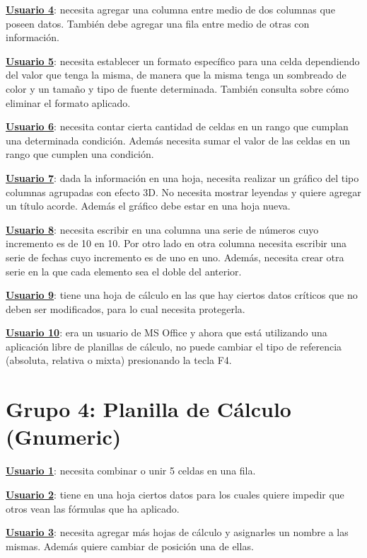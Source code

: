 \documentclass[12pt]{article}
\begin{document}
\textbf{\underline{Usuario 4}}: necesita agregar una columna entre medio de dos columnas que poseen datos. También debe agregar una fila entre medio de otras con información.

\textbf{\underline{Usuario 5}}: necesita establecer un formato específico para una celda dependiendo del valor que tenga la misma, de manera que la misma tenga un sombreado de color y un tamaño y tipo de fuente determinada. También consulta sobre cómo eliminar el formato aplicado.

\textbf{\underline{Usuario 6}}: necesita contar cierta cantidad de celdas en un rango que cumplan una determinada condición. Además necesita sumar el valor de las celdas en un rango que cumplen una condición. 

\textbf{\underline{Usuario 7}}: dada la información en una hoja, necesita realizar un gráfico del tipo columnas agrupadas con efecto 3D. No necesita mostrar leyendas y quiere agregar un título acorde. Además el gráfico debe estar en una hoja nueva.

\textbf{\underline{Usuario 8}}: necesita escribir en una columna una serie de números cuyo incremento es de 10 en 10. Por otro lado en otra columna necesita escribir una serie de fechas cuyo incremento es de uno en uno. Además, necesita crear otra serie en la que cada elemento sea el doble del anterior. 

\textbf{\underline{Usuario 9}}: tiene una hoja de cálculo en las que hay ciertos datos críticos que no deben ser modificados, para lo cual necesita protegerla.

\textbf{\underline{Usuario 10}}: era un usuario de MS Office y ahora que está utilizando una aplicación libre de planillas de cálculo, no puede cambiar el tipo de referencia (absoluta, relativa o mixta) presionando la tecla F4.

\section*{\textbf{Grupo 4: Planilla de Cálculo (Gnumeric)}}

\textbf{\underline{Usuario 1}}: necesita combinar o unir 5 celdas en una fila.

\textbf{\underline{Usuario 2}}: tiene en una hoja ciertos datos para los cuales quiere impedir que otros vean las fórmulas que ha aplicado.

\textbf{\underline{Usuario 3}}: necesita agregar más hojas de cálculo y asignarles un nombre a las mismas. Además quiere cambiar de posición una de ellas.
\end{document}
